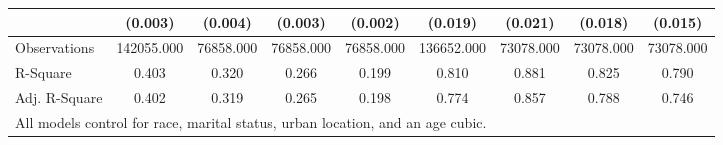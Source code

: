 \documentclass[border=3mm,preview]{standalone}
\begin{document}
\begin{landscape}
\begin{table}
\begin{tabular}{l*{8}{c}}
                    &     (0.003)         &     (0.004)         &     (0.003)         &     (0.002)         &     (0.019)         &     (0.021)         &     (0.018)         &     (0.015)         \\
\hline
Observations        &  142055.000         &   76858.000         &   76858.000         &   76858.000         &  136652.000         &   73078.000         &   73078.000         &   73078.000         \\
R-Square            &       0.403         &       0.320         &       0.266         &       0.199         &       0.810         &       0.881         &       0.825         &       0.790         \\
Adj. R-Square       &       0.402         &       0.319         &       0.265         &       0.198         &       0.774         &       0.857         &       0.788         &       0.746         \\
\hline
\multicolumn{9}{l}{\small{All models control for race, marital status, urban location, and an age cubic.}} \\
\end{tabular}
\end{table}
\end{landscape}
\end{document}
